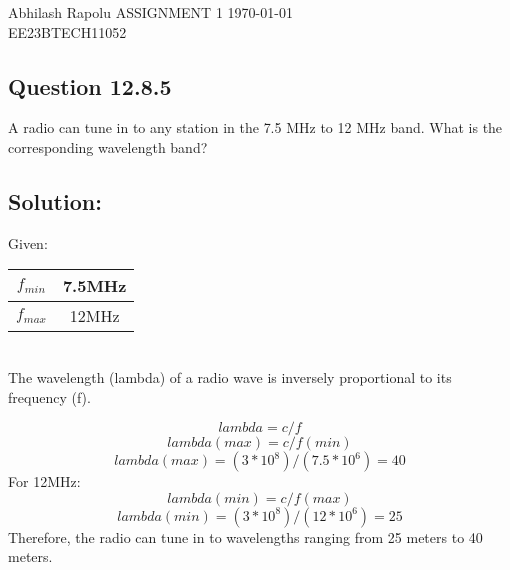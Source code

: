 \documentclass[12pt]{article}
\begin{document}
 Abhilash Rapolu \hfill {\Large ASSIGNMENT 1} \hfill \today
\\EE23BTECH11052
\subsection*{Question 12.8.5}
 A radio can tune in to any station in the 7.5 MHz to 12 MHz band.
 What is the corresponding wavelength band?

\subsection*{Solution:}
Given:
\begin{tabular}{|c|c|}
    \hline
    $f_{min}$&7.5MHz \\ \hline
    $f_{max}$&12MHz \\ \hline
\end{tabular}
\\The wavelength (lambda) of a radio wave is inversely proportional to its frequency (f).

\bgroup \obeylines
$$lambda=c/f$$
$$lambda(max)=c/f(min)$$
\egroup
\begin{equation}
lambda(max)=(3*10^{8})/(7.5*10^{6})=40
\end{equation}
For 12MHz:
$$lambda(min)=c/f(max)$$
\begin{equation}
lambda(min)=(3*10^{8})/(12*10^{6})=25
\end{equation}
Therefore, the radio can tune in to wavelengths ranging from 25 meters to 40 meters.
\end{document}
